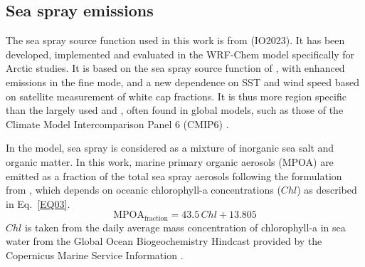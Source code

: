     \subsection{Sea spray emissions}
    \label{sec:seaspray_emiss}
    The sea spray source function used in this work is from \citet{ioannidis_modelling_2023} (IO2023). It has been developed, implemented and evaluated in the WRF-Chem model specifically for Arctic studies. It is based on the sea spray source function of \citet{gong_parameterization_2003}, with enhanced emissions in the fine mode, and a new dependence on SST and wind speed based on satellite measurement of white cap fractions.
    It is thus more region specific than the largely used \citet{gong_parameterization_2003} and \citet{monahan_model_1986}, often found in global models, such as those of the Climate Model Intercomparison Panel 6 (CMIP6) \citep{lapere_representation_2023}.
    
   
    In the model, sea spray is considered as a mixture of inorganic sea salt and organic matter.
    In this work, marine primary organic aerosols (MPOA) are emitted as a fraction of the total sea spray aerosols following the formulation from \citet{vignati_global_2010}, which depends on oceanic chlorophyll-a concentrations ($Chl$) as described in Eq.~\eqref{EQ03}. 
    \begin{equation}\label{EQ03}
    \mathrm{MPOA_{\text{fraction}}} = 43.5\, Chl + 13.805
    \end{equation}
    $Chl$ is taken from the daily average mass concentration of chlorophyll-a in sea water from the Global Ocean Biogeochemistry Hindcast provided by the Copernicus Marine Service Information \citep{copernicus_marine_service_information_global_2025}.
   
